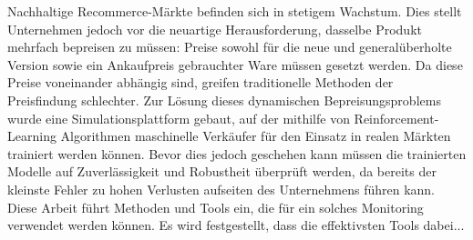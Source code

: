 Nachhaltige Recommerce-Märkte befinden sich in stetigem Wachstum. Dies stellt Unternehmen jedoch vor die neuartige Herausforderung, dasselbe Produkt mehrfach bepreisen zu müssen: Preise sowohl für die neue und generalüberholte Version sowie ein Ankaufpreis gebrauchter Ware müssen gesetzt werden. Da diese Preise voneinander abhängig sind, greifen traditionelle Methoden der Preisfindung schlechter. Zur Lösung dieses dynamischen Bepreisungsproblems wurde eine Simulationsplattform gebaut, auf der mithilfe von Reinforcement-Learning Algorithmen maschinelle Verkäufer für den Einsatz in realen Märkten trainiert werden können. Bevor dies jedoch geschehen kann müssen die trainierten Modelle auf Zuverlässigkeit und Robustheit  überprüft werden, da bereits der kleinste Fehler zu hohen Verlusten aufseiten des Unternehmens führen kann. Diese Arbeit führt Methoden und Tools ein, die für ein solches Monitoring verwendet werden können. Es wird festgestellt, dass die effektivsten Tools dabei... 